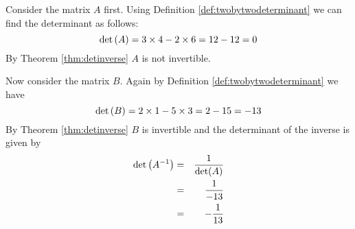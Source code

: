 \begin{solution}
Consider the matrix $A$ first. Using Definition \ref{def:twobytwodeterminant} we can find the determinant as follows:
\[
\det \left(A \right) = 3 \times 4 - 2 \times 6 = 12 - 12 = 0
\]
By Theorem \ref{thm:detinverse} $A$ is not invertible.

Now consider the matrix $B$. Again by Definition \ref{def:twobytwodeterminant} we have 
\[
\det \left(B \right) = 2 \times 1 - 5 \times 3 = 2 - 15 = -13
\]
By Theorem \ref{thm:detinverse} $B$ is invertible and the determinant of the inverse is given by 
\begin{eqnarray*}
\det \left(A^{-1} \right) &=& \frac{1}{\det(A)} \\
&=& \frac{1}{-13} \\
&=& -\frac{1}{13}
\end{eqnarray*}

\end{solution}
